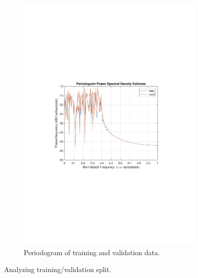 \documentclass[]{article}
\begin{document}
\begin{figure}[ht]
\begin{subfigure}{.49\textwidth}
	\includegraphics[trim= 10cm 8cm 10cm 8cm, scale=0.4]{figures/periodogram-train_valid.pdf}
	\caption{Periodogram of training and validation data.}
	\label{fig:periodogram-train_valid}
\end{subfigure}
\caption{Analyzing training/validation split.}
\label{fig:train_valid}
\end{figure}
\end{document}
